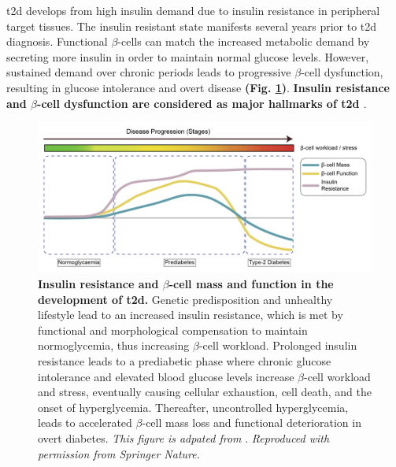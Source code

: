 \gls{t2d} develops from high insulin demand due to insulin resistance in peripheral target tissues. The insulin resistant state manifests several years prior to \gls{t2d} diagnosis. Functional $\beta$-cells can match the increased metabolic demand by secreting more insulin in order to maintain normal glucose levels. However, sustained demand over chronic periods leads to progressive $\beta$-cell dysfunction, resulting in glucose intolerance and overt disease \textbf{(Fig. \ref{fig:chp1_t2d_patho})}. \textbf{Insulin resistance and $\beta$-cell dysfunction are considered as major hallmarks of \gls{t2d} \cite{banday_pathophysiology_2020}}.\\

\begin{figure}[H]
    \centering
    \includegraphics[width=\linewidth]{Chapter1/Fig/F1-3-04.png}
    \caption[Pathogenesis of Type-2 Diabetes]{\textbf{Insulin resistance and $\beta$-cell mass and function in the development of \gls{t2d}.} Genetic predisposition and unhealthy lifestyle lead to an increased insulin resistance, which is met by functional and morphological compensation to maintain normoglycemia, thus increasing $\beta$-cell workload. Prolonged insulin resistance leads to a prediabetic phase where chronic glucose intolerance and elevated blood glucose levels increase $\beta$-cell workload and stress, eventually causing cellular exhaustion, cell death, and the onset of hyperglycemia. Thereafter, uncontrolled hyperglycemia, leads to accelerated $\beta$-cell mass loss and functional deterioration in overt diabetes. \textit{This figure is adpated from }\textbf{\cite{chen_human_2017}}.\textit{ Reproduced with permission from Springer Nature.}}
    \label{fig:chp1_t2d_patho}
\end{figure}

